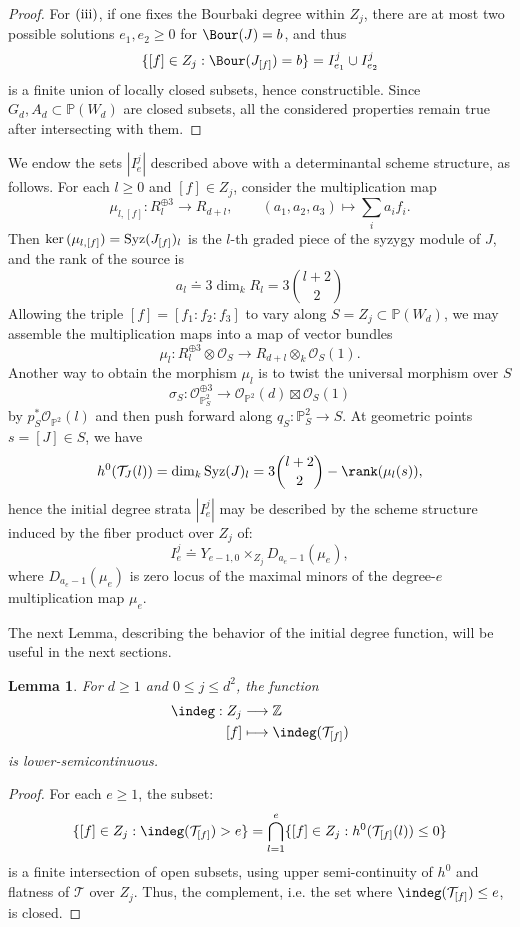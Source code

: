 \documentclass[11pt]{amsart} %
\newcommand{\lar}{\longrightarrow}
\newtheorem{Lemma}[Theorem]{Lemma}
\theoremstyle{definition}
\def\ker{{\rm ker}\,}
\def\syz{\mbox{\rm Syz}}
\def\T{{\mathcal T}}
\begin{document}
\begin{proof}
For ${\rm (iii)}$, if one fixes the Bourbaki degree within $Z_j$, there are at most two possible solutions $e_1, e_2 \geq 0$ for $\Bour(J) = b$, and thus
$$
\{[f] \in Z_j : \Bour(J_{[f]}) = b \} = I_{e_1}^j \cup I_{e_2}^j
$$
is a finite union of locally closed subsets, hence constructible. Since $G_d, A_d \subset \mathbb{P}(W_d)$ are closed subsets, all the considered properties remain true after intersecting with them.
\end{proof}

We endow the sets $|I_e^j|$ described above with a determinantal scheme structure, as follows. For each $l\ge0$ and $[f]\in Z_j$, consider the multiplication map
\[
\mu_{l,[f]}:R_l^{\oplus3}\longrightarrow R_{d+l},
\qquad
(a_1,a_2,a_3)\longmapsto\sum_i a_if_i.
\]
Then $\ker(\mu_{l, [f]}) = \syz(J_{[f]})_l$ is the $l$-th graded piece of the syzygy module of $J$, and the rank of the source is
$$
a_l \doteq 3 \dim_k R_{l} = 3\binom{l+2}{2}
$$
Allowing the triple $[f] = [f_1:f_2:f_3]$ to vary along $S = Z_j \subset \mathbb{P}(W_d)$, we may assemble the multiplication maps into a map of vector bundles
$$
\mu_l : R_l^{\oplus 3} \otimes \mathcal{O}_S \lar R_{d+l} \otimes_k \mathcal{O}_S(1).
$$
Another way to obtain the morphism $\mu_l$ is to twist the universal morphism over $S$
$$
\sigma_S : \mathcal{O}_{\mathbb{P}^2_S}^{\oplus 3} \lar \mathcal{O}_{\mathbb{P}^2}(d) \boxtimes \mathcal{O}_S(1)
$$
by $p_S^*\mathcal{O}_{\mathbb{P}^2}(l)$ and then push forward along $q_S:\mathbb{P}^2_S\lar S$. At geometric points $s = [J] \in S$, we have
$$
h^0(\T_{J}(l)) = \dim_k \syz(J)_l = 3 \binom{l+2}{2}- \rank(\mu_{l}(s)),
$$
hence the initial degree strata $|I_e^j|$ may be described by the scheme structure induced by the fiber product over $Z_j$ of:
$$
I_e^j \doteq Y_{e-1, 0} \times_{Z_j} D_{a_e-1}(\mu_e),
$$
where $D_{a_e-1}(\mu_e)$ is zero locus of the maximal minors of the degree-$e$ multiplication map $\mu_e$.

The next Lemma, describing the behavior of the initial degree function, will be useful in the next sections.

\begin{Lemma}\label{lem:indeg-lowersemicontinuous}
For $d \geq 1$ and $0 \leq j \leq d^2$, the function
\begin{align*}
\indeg:Z_j &\lar \mathbb{Z}\\
[f]&\longmapsto \indeg(\T_{[f]})
\end{align*}
is lower-semicontinuous.
\end{Lemma}

\begin{proof}
For each $e \geq 1$, the subset:
\[
\{[f] \in Z_j : \indeg(\mathcal{T}_{[f]}) > e\} = \bigcap_{l=1}^{e} \{{[f]} \in Z_j : h^0(\mathcal{T}_{[f]}(l)) \leq 0\}
\]
is a finite intersection of open subsets, using upper semi-continuity of $h^0$ and flatness of $\mathcal{T}$ over $Z_j$. Thus, the complement, i.e. the set where $\indeg(\T_{[f]}) \leq e$, is closed. 
\end{proof}
\end{document}
